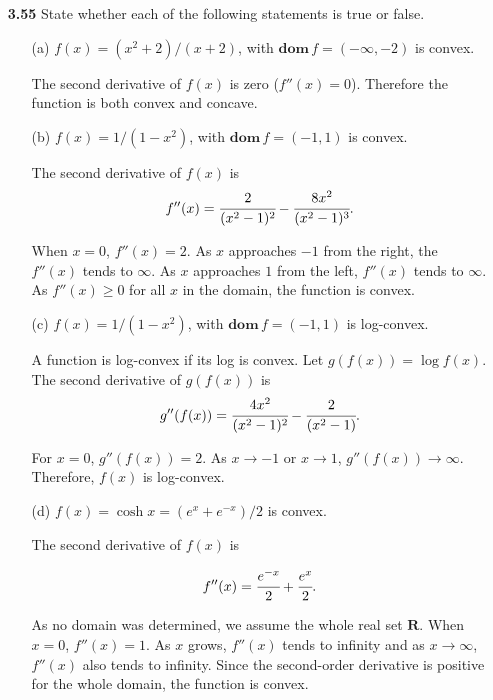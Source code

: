 \documentclass[11pt,a4paper]{article}
\begin{document}
\begin{itemize}
    \item[\textbf{3.55}] State whether each of the following statements is true or false.
    \item[] \begin{itemize}
        \item[(a)] $f(x) = (x^2 + 2)/(x + 2)$, with $\textbf{dom}\, f = (-\infty, -2)$ is convex.
        
        The second derivative of $f(x)$ is zero ($f''(x) = 0$). Therefore the function is both convex and concave. 
        
        \item[(b)] $f(x) = 1/(1-x^2)$, with $\textbf{dom} \, f = (-1,1)$ is convex.
        
        The second derivative of $f(x)$ is
        \begin{equation*}
            f''(x) = \cfrac{2}{(x^2 - 1)^2} - \cfrac{8x^2}{(x^2 - 1)^3}.
        \end{equation*}

        When $x=0$, $f''(x) = 2$. As $x$ approaches $-1$ from the right, the $f''(x)$ tends to $\infty$. As $x$ approaches $1$ from the left, $f''(x)$ tends to $\infty$. As $f''(x) \geq 0$ for all $x$ in the domain, the function is convex. 

        \item[(c)] $f(x) = 1/(1-x^2)$, with $\textbf{dom} \, f = (-1,1)$ is log-convex.
        
        A function is log-convex if its log is convex. Let $g(f(x)) = \log f(x)$. The second derivative of $g(f(x))$ is
        \begin{equation*}
            g''(f(x)) = \cfrac{4x^2}{(x^2 - 1)^2} - \cfrac{2}{(x^2 - 1)}.
        \end{equation*}

        For $x=0$, $g''(f(x)) = 2$. As $x \to -1$ or $x \to 1$, $g''(f(x)) \to \infty$. Therefore, $f(x)$ is log-convex. 
        \item[(d)] $f(x) = \cosh x = (e^x + e^{-x})/2$ is convex.
        
        The second derivative of $f(x)$ is

        \begin{equation*}
            f''(x) = \cfrac{e^{-x}}{2} + \cfrac{e^{x}}{2}.
        \end{equation*}

        As no domain was determined, we assume the whole real set $\mathbf{R}$. When $x = 0$, $f''(x) = 1$. As $x$ grows, $f''(x)$ tends to infinity and as $x \to \infty$, $f''(x)$ also tends to infinity. Since the second-order derivative is positive for the whole domain, the function is convex. 


\end{itemize}
\end{itemize}
\end{document}
